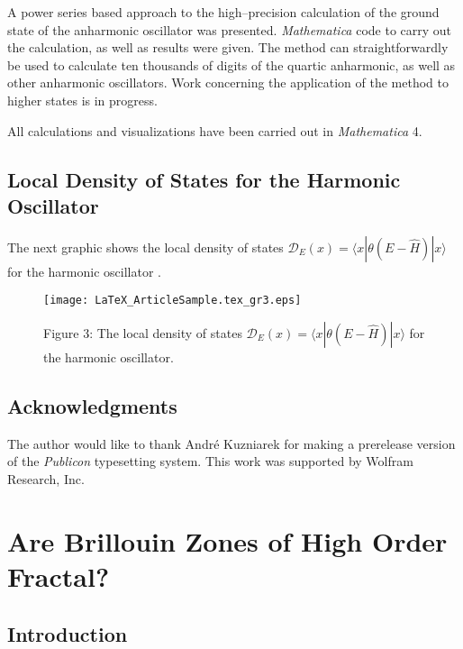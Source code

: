 \documentclass{article}
\begin{document}
\noindent A power series based approach to the high--precision calculation
of the ground state of the anharmonic oscillator was presented.
{\itshape Mathematica} code to carry out the calculation, as well
as results were given. The method can straightforwardly be used
to calculate ten thousands of digits of the quartic anharmonic,
as well as other anharmonic oscillators. Work concerning the application
of the method to higher states is in progress. 

All calculations and visualizations have been carried out in {\itshape
Mathematica} 4.
\subsection{Local Density of States for the Harmonic Oscillator}

\noindent The next graphic shows the local density of states ${\mathcal
D}_{E}( x) =\langle x|\theta ( E-\hat{H}) |x\rangle $ for the harmonic
oscillator \cite{Trott00A}. 
\begin{figure}[h]
\begin{center}
\texttt{[image: LaTeX\_ArticleSample.tex\_gr3.eps]}

\end{center}
\caption{Figure 3: The local density of states ${\mathcal D}_{E}(
x) =\langle x|\theta ( E-\hat{H}) |x\rangle $ for the harmonic oscillator.}
\end{figure}
\subsection{Acknowledgments}

\noindent The author would like to thank Andr\'e Kuzniarek for making
a prerelease version of the {\itshape Publicon} typesetting system.
This work was supported by Wolfram Research, Inc.
\section{Are Brillouin Zones of High Order Fractal?}
\subsection{Introduction}
\end{document}
